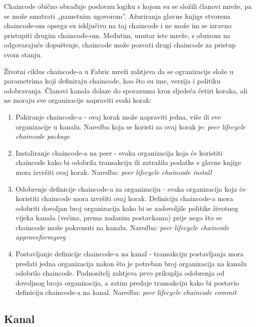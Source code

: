 \documentclass[times, utf8, diplomski]{fer}
\begin{document}
Chaincode obično obrađuje poslovnu logiku s kojom su se složili članovi mreže, pa se može smatrati „pametnim ugovorom”. Ažuriranja glavne knjige stvorena chaincode-om opsega su isključivo na taj chaincode i ne može im se izravno pristupiti drugim chaincode-om. Međutim, unutar iste mreže, s obzirom na odgovarajuće dopuštenje,  chaincode može pozvati drugi chaincode za pristup svom stanju.

Životni ciklus chaincode-a u Fabric mreži zahtjeva da se ogranizacije slože u parametrima koji definiraju chaincode, kao što su ime, verzija i politiku odobravanja.  Članovi kanala dolaze do sporazuma kroz sljedeća četiri koraka, ali ne moraju sve organizacije napraviti svaki korak:

\begin{enumerate}
\item Pakiranje chaincode-a - ovaj korak može napraviti jedna,  više ili sve organizacije u kanalu.  Naredba koja se koristi za ovaj korak je: 
\textit{peer lifecycle chaincode package}

\item Instaliranje chaincode-a na peer - svaka organizacija koja će koristiti chaincode kako bi odobrila transakciju ili zatražila podatke s glavne knjige mora izvršiti ovaj korak.  Naredba:
\textit{peer lifecycle chaincode install}

\item Odobrenje definicije chaincode-a za organizaciju - svaka organizacija koja će koristiti chaincode mora izvršiti ovaj korak.  Definiciju chaincode-a mora odobriti dovoljan broj organizacija kako bi se zadovoljile politike životnog vijeka kanala (većina,  prema zadanim postavkama) prije nego što se chaincode može pokrenuti na kanalu.  Naredba:
\textit{peer lifecycle chaincode approveformyorg}

\item  Postavljanje definicije chaincode-a na kanal - transakciju postavljanja mora predati jedna organizacija nakon što je potreban broj organizacija na kanalu odobrilo chaincode. Podnositelj zahtjeva prvo prikuplja odobrenja od dovoljnog broja organizacija,  a zatim predaje transakciju kako bi postavio definiciju chaincode-a na kanal. Naredba:
\textit{peer lifecycle chaincode commit}
\end{enumerate}

\subsection{Kanal}
\end{document}
